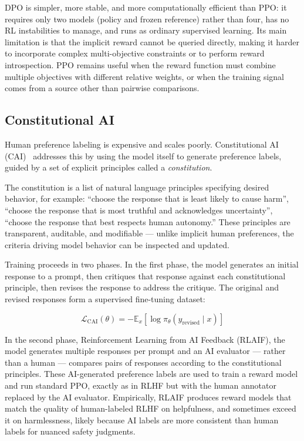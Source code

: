 \documentclass{book}
\begin{document}
DPO is simpler, more stable, and more computationally efficient than PPO:
it requires only two models (policy and frozen reference) rather than four,
has no RL instabilities to manage, and runs as ordinary supervised learning.
Its main limitation is that the implicit reward cannot be queried directly,
making it harder to incorporate complex multi-objective constraints or to
perform reward introspection. PPO remains useful when the reward function
must combine multiple objectives with different relative weights, or when
the training signal comes from a source other than pairwise comparisons.

\subsection{Constitutional AI}
\label{sec:constitutional_ai}

Human preference labeling is expensive and scales poorly. Constitutional
AI (CAI)~\cite{bai2022} addresses this by using the model itself to
generate preference labels, guided by a set of explicit principles called
a \emph{constitution}.

The constitution is a list of natural language principles specifying
desired behavior, for example: ``choose the response that is least likely
to cause harm'', ``choose the response that is most truthful and
acknowledges uncertainty'', ``choose the response that best respects human
autonomy.'' These principles are transparent, auditable, and modifiable ---
unlike implicit human preferences, the criteria driving model behavior can
be inspected and updated.

Training proceeds in two phases. In the first phase, the model generates
an initial response to a prompt, then critiques that response against each
constitutional principle, then revises the response to address the critique.
The original and revised responses form a supervised fine-tuning dataset:

\begin{equation}
\label{eq:cai_sft}
\mathcal{L}_{\text{CAI}}(\theta)
= -\mathbb{E}_{x}\!\left[
    \log \pi_\theta(y_{\text{revised}} \mid x)
\right]
\end{equation}

In the second phase, Reinforcement Learning from AI Feedback (RLAIF),
the model generates multiple responses per prompt and an AI evaluator ---
rather than a human --- compares pairs of responses according to the
constitutional principles. These AI-generated preference labels are used
to train a reward model and run standard PPO, exactly as in RLHF but
with the human annotator replaced by the AI evaluator. Empirically, RLAIF
produces reward models that match the quality of human-labeled RLHF on
helpfulness, and sometimes exceed it on harmlessness, likely because AI
labels are more consistent than human labels for nuanced safety judgments.
\end{document}
